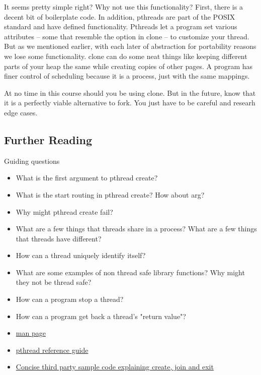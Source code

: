 It seems pretty simple right?
Why not use this functionality?
First, there is a decent bit of boilerplate code.
In addition, pthreads are part of the POSIX standard and have defined functionality.
Pthreads let a program set various attributes -- some that resemble the option in clone -- to customize your thread.
But as we mentioned earlier, with each later of abstraction for portability reasons we lose some functionality.
clone can do some neat things like keeping different parts of your heap the same while creating copies of other pages.
A program has finer control of scheduling because it is a process, just with the same mappings.

At no time in this course should you be using clone.
But in the future, know that it is a perfectly viable alternative to fork.
You just have to be careful and researh edge cases.

\subsection{Further Reading}

Guiding questions

\begin{itemize}
\item What is the first argument to pthread create?
\item What is the start routing in pthread create? How about arg?
\item Why might pthread create fail?
\item What are a few things that threads share in a process? What are a few things that threads have different?
\item How can a thread uniquely identify itself?
\item What are some examples of non thread safe library functions? Why might they not be thread safe?
\item How can a program stop a thread?
\item How can a program get back a thread's "return value"?
\end{itemize}

\begin{itemize}
\item \href{http://man7.org/linux/man-pages/man3/pthread_create.3.html}{man page}
\item \href{http://man7.org/linux/man-pages/man7/pthreads.7.html}{pthread reference guide}
\item \href{http://www.thegeekstuff.com/2012/04/terminate-c-thread/}{Concise third party sample code explaining create, join and exit}
\end{itemize}

